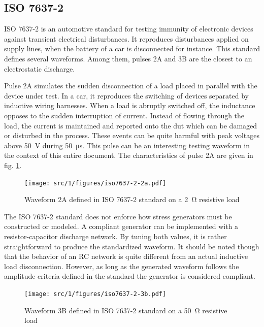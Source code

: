 \subsection{ISO 7637-2}

ISO 7637-2\cite{iso7637-2} is an automotive standard for testing immunity of electronic devices against transient electrical disturbances.
It reproduces disturbances applied on supply lines, when the battery of a car is disconnected for instance.
This standard defines several waveforms.
Among them, pulses 2A and 3B are the closest to an electrostatic discharge.

Pulse 2A simulates the sudden disconnection of a load placed in parallel with the device under test.
In a car, it reproduces the switching of devices separated by inductive wiring harnesses.
When a load is abruptly switched off, the inductance opposes to the sudden interruption of current.
Instead of flowing through the load, the current is maintained and reported onto the \gls{dut} which can be damaged or disturbed in the process.
These events can be quite harmful with peak voltages above \SI{50}{\volt} during \SI{50}{\micro\second}.
This pulse can be an interesting testing waveform in the context of this entire document.
The characteristics of pulse 2A are given in fig. \ref{fig:iso_2a_pulse}.

\begin{figure}[!h]
  \centering
  \texttt{[image: src/1/figures/iso7637-2-2a.pdf]}
  \caption{Waveform 2A defined in ISO 7637-2 standard on a \SI{2}{\ohm} resistive load}
  \label{fig:iso_2a_pulse}
\end{figure}

The ISO 7637-2 standard does not enforce how stress generators must be constructed or modeled.
A compliant generator can be implemented with a resistor-capacitor discharge network.
By tuning both values, it is rather straightforward to produce the standardized waveform.
It should be noted though that the behavior of an RC network is quite different from an actual inductive load disconnection.
However, as long as the generated waveform follows the amplitude criteria defined in the standard the generator is considered compliant.

\begin{figure}[!h]
  \centering
  \texttt{[image: src/1/figures/iso7637-2-3b.pdf]}
  \caption{Waveform 3B defined in ISO 7637-2 standard on a \SI{50}{\ohm} resistive load}
  \label{fig:iso_2b_pulse}
\end{figure}

